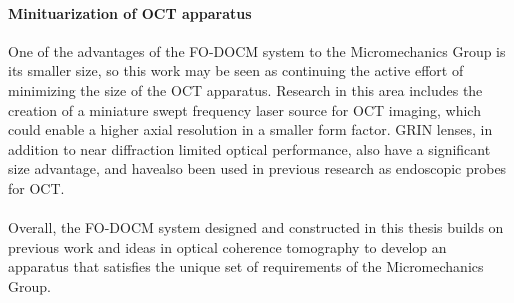
\paragraph{Minituarization of OCT apparatus} One of the advantages of the FO-DOCM system to the Micromechanics Group is its smaller size, so this work may be seen as continuing the active effort of minimizing the size of the OCT apparatus. Research in this area includes the creation of a miniature swept frequency laser source for OCT imaging, which could enable a higher axial resolution in a smaller form factor. \cite{Goldberg2009} GRIN lenses, in addition to near diffraction limited optical performance, also have a significant size advantage, and havealso been used in previous research as endoscopic probes for OCT. \cite{Xie2006}





% 





\paragraph{} Overall, the FO-DOCM system designed and constructed in this thesis builds on previous work and ideas in optical coherence tomography to develop an apparatus that satisfies the unique set of requirements of the Micromechanics Group.